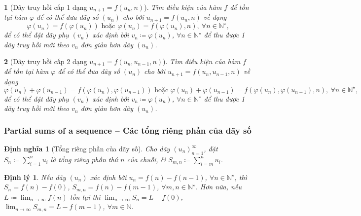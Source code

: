 \documentclass{article}
\newtheorem{baitoan}{}
\newtheorem{dinhly}{Định lý}
\newtheorem{dinhnghia}{Định nghĩa}
\begin{document}
\begin{baitoan}[Dãy truy hồi cấp 1 dạng $u_{n+1} = f(u_n,n)$]
	Tìm điều kiện của hàm $f$ để tồn tại hàm $\varphi$ để có thể đưa dãy số $(u_n)$ cho bởi $u_{n+1} = f(u_n,n)$ về dạng
	\begin{equation*}
		\varphi(u_n) = f(\varphi(u_n))\mbox{ hoặc }\varphi(u_n) = f(\varphi(u_n),n),\ \forall n\in\mathbb{N}^\star,
	\end{equation*}
	để có thể đặt dãy phụ $(v_n)$ xác định bởi $v_n\coloneqq\varphi(u_n)$, $\forall n\in\mathbb{N}^\star$ để thu được 1 dãy truy hồi mới theo $v_n$ đơn giản hơn dãy $(u_n)$.
\end{baitoan}

\begin{baitoan}[Dãy truy hồi cấp 2 dạng $u_{n+1} = f(u_n,u_{n-1},n)$]
	Tìm điều kiện của hàm $f$ để tồn tại hàm $\varphi$ để có thể đưa dãy số $(u_n)$ cho bởi $u_{n+1} = f(u_n,u_{n-1},n)$ về dạng
	\begin{equation*}
		\varphi(u_n) + \varphi(u_{n-1}) = f(\varphi(u_n),\varphi(u_{n-1}))\mbox{ hoặc }\varphi(u_n) + \varphi(u_{n-1}) = f(\varphi(u_n),\varphi(u_{n-1}),n),\ \forall n\in\mathbb{N}^\star,
	\end{equation*}
	để có thể đặt dãy phụ $(v_n)$ xác định bởi $v_n\coloneqq\varphi(u_n)$, $\forall n\in\mathbb{N}^\star$ để thu được 1 dãy truy hồi mới theo $v_n$ đơn giản hơn dãy $(u_n)$.
\end{baitoan}


\subsubsection{Partial sums of a sequence -- Các tổng riêng phần của dãy số}

\begin{dinhnghia}[Tổng riêng phần của dãy số]
	Cho dãy $(u_n)_{n=1}^\infty$, đặt $S_n\coloneqq\sum_{i=1}^n u_i$ là {\rm tổng riêng phần thứ $n$} của chuỗi, \& $S_{m,n}\coloneqq\sum_{i=m}^n u_i$.
\end{dinhnghia}

\begin{dinhly}
	Nếu dãy $(u_n)$ xác định bởi $u_n = f(n) - f(n - 1)$, $\forall n\in\mathbb{N}^\star$, thì $S_n = f(n) - f(0)$, $S_{m,n} = f(n) - f(m - 1)$, $\forall m,n\in\mathbb{N}^\star$. Hơn nữa, nếu $L\coloneqq\lim_{n\to\infty} f(n)$ tồn tại thì $\lim_{n\to\infty} S_n = L - f(0)$, $\lim_{n\to\infty} S_{m,n} = L - f(m - 1)$, $\forall m\in\mathbb{N}$.
\end{dinhly}
\end{document}
